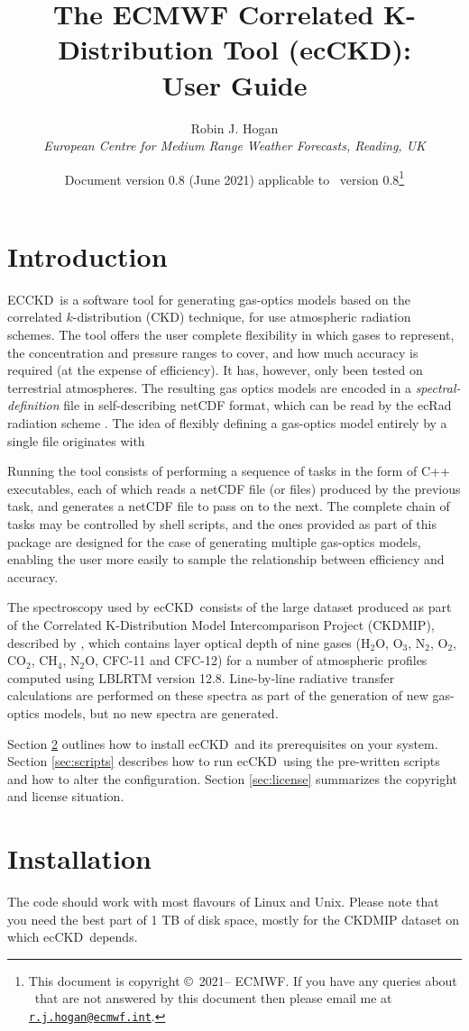 \documentclass[a4,oneside]{article}
\title{The ECMWF Correlated K-Distribution Tool (ecCKD): \\ User Guide}
\author{Robin J. Hogan\\ \emph{European Centre for Medium Range
    Weather Forecasts, Reading, UK}}
\date{Document version 0.8 (June 2021) applicable to 
  \ecckd\ version 0.8\thanks{This document is copyright
    \copyright\ 2021-- ECMWF. If you have any queries about
    \ecckd\ that are not answered by this document
%
%
    then please email me at
    \href{mailto:r.j.hogan@ecmwf.int}{\texttt{r.j.hogan@ecmwf.int}}.}}
\newcommand{\ecckd}{ecCKD}
\newcommand{\Ecckd}{ECCKD}
\begin{document}
\maketitle

\section{Introduction}
\Ecckd\ is a software tool for generating gas-optics models based on
the correlated $k$-distribution (CKD) technique, for use atmospheric
radiation schemes. The tool offers the user complete flexibility in
which gases to represent, the concentration and pressure ranges to
cover, and how much accuracy is required (at the expense of
efficiency). It has, however, only been tested on terrestrial
atmospheres.  The resulting gas optics models are encoded in a
\emph{spectral-definition} file in self-describing netCDF format,
which can be read by the ecRad radiation scheme
\citep{Hogan&2018}. The idea of flexibly defining a gas-optics model
entirely by a single file originates with \cite{Edwards&1996}

Running the tool consists of performing a sequence of tasks in the
form of C++ executables, each of which reads a netCDF file (or files)
produced by the previous task, and generates a netCDF file to pass on
to the next. The complete chain of tasks may be controlled by shell
scripts, and the ones provided as part of this package are designed
for the case of generating multiple gas-optics models, enabling the
user more easily to sample the relationship between efficiency and
accuracy.

The spectroscopy used by \ecckd\ consists of the large dataset
produced as part of the Correlated K-Distribution Model
Intercomparison Project (CKDMIP), described by \cite{Hogan&2020},
which contains layer optical depth of nine gases (H$_2$O, O$_3$,
N$_2$, O$_2$, CO$_2$, CH$_4$, N$_2$O, CFC-11 and CFC-12) for a number
of atmospheric profiles computed using LBLRTM version
12.8. Line-by-line radiative transfer calculations are performed on
these spectra as part of the generation of new gas-optics models, but
no new spectra are generated.

Section \ref{sec:installation} outlines how to install \ecckd\ and its
prerequisites on your system. Section \ref{sec:scripts} describes how
to run \ecckd\ using the pre-written scripts and how to alter the
configuration. Section \ref{sec:license} summarizes the copyright
and license situation.

\section{Installation}
\label{sec:installation}
The code should work with most flavours of Linux and Unix. Please note
that you need the best part of 1 TB of disk space, mostly for the
CKDMIP dataset on which \ecckd\ depends.
\end{document}

